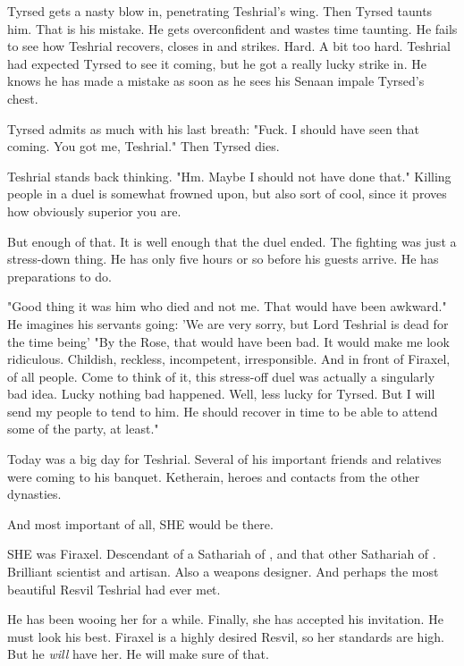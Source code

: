 Tyrsed gets a nasty blow in, penetrating Teshrial's wing. 
Then Tyrsed taunts him.
That is his mistake. 
He gets overconfident and wastes time taunting. 
He fails to see how Teshrial recovers, closes in and strikes. 
Hard. 
A bit too hard. 
Teshrial had expected Tyrsed to see it coming, but he got a really lucky strike in. 
He knows he has made a mistake as soon as he sees his Senaan impale Tyrsed's chest. 

Tyrsed admits as much with his last breath:
"Fuck. I should have seen that coming. You got me, Teshrial."
Then Tyrsed dies. 

Teshrial stands back thinking. 
"Hm. Maybe I should not have done that."
Killing people in a duel is somewhat frowned upon, but also sort of cool, since it proves how obviously superior you are. 

But enough of that. 
It is well enough that the duel ended.
The fighting was just a stress-down thing. 
He has only five hours or so before his guests arrive. 
He has preparations to do. 

"Good thing it was him who died and not me.
That would have been awkward."
He imagines his servants going: 
'We are very sorry, but Lord Teshrial is dead for the time being\prikker'
"By the Rose, that would have been bad. 
It would make me look ridiculous. 
Childish, reckless, incompetent, irresponsible. 
And in front of Firaxel, of all people.
Come to think of it, this stress-off duel was actually a singularly bad idea.
Lucky nothing bad happened.
Well, less lucky for Tyrsed.
But I will send my people to tend to him.
He should recover in time to be able to attend some of the party, at least."

Today was a big day for Teshrial. 
Several of his important friends and relatives were coming to his banquet. 
Ketherain, heroes and contacts from the other dynasties. 

And most important of all, SHE would be there. 

SHE was Firaxel. 
Descendant of a Sathariah of \CiriathSepher, and that other Sathariah of \TiphredSerah. 
Brilliant scientist and artisan. 
Also a weapons designer. 
And perhaps the most beautiful Resvil Teshrial had ever met. 

He has been wooing her for a while. 
Finally, she has accepted his invitation. 
He must look his best. 
Firaxel is a highly desired Resvil, so her standards are high.
But he \emph{will} have her. 
He will make sure of that. 









